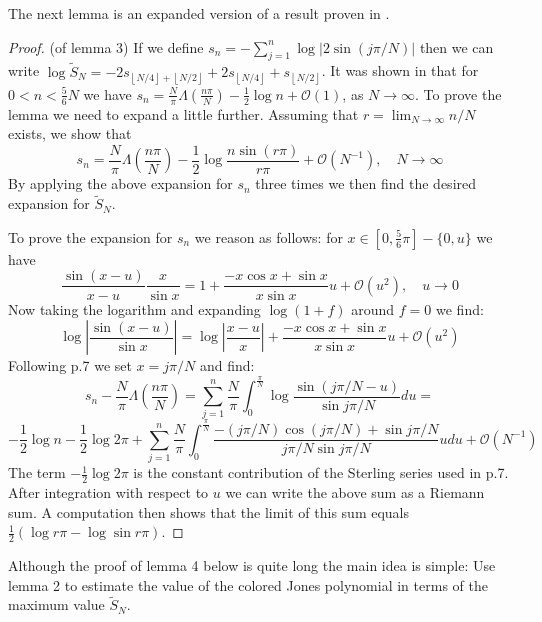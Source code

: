 \documentclass[letterpaper]{article}
\begin{document}
\noindent The next lemma is an expanded version of a result proven in \cite{HaoZheng}.

\begin{proof} (of lemma 3)
If we define $s_n = -\sum_{j=1}^n \log|2\sin(j\pi/N)|$ then we can write $\log \tilde{S}_N = -2s_{\left\lfloor N/4 \right\rfloor + \left\lfloor N/2 \right\rfloor}+2s_{\left\lfloor N/4 \right\rfloor}+s_{\left\lfloor N/2 \right\rfloor}$. It was shown in \cite{HaoZheng} that for $0<n<\frac{5}{6}N$ we have $s_n = \frac{N}{\pi}\Lambda(\frac{n\pi}{N})-\frac{1}{2}\log n + \mathcal{O}(1)$, as $N\to \infty$. To prove the lemma we need to expand a little further. Assuming that $r = \lim_{N\to\infty}n/N$ exists, we show that $$s_n = \frac{N}{\pi}\Lambda(\frac{n\pi}{N})-\frac{1}{2}\log \frac{n\sin(r\pi)}{r\pi} + \mathcal{O}(N^{-1}), \quad N\to \infty$$
By applying the above expansion for $s_n$ three times we then find the desired expansion for $\tilde{S}_N$.

To prove the expansion for $s_n$ we reason as follows: for $x\in [0,\frac{5}{6}\pi]-\{0,u\}$ we have $$\frac{\sin(x-u)}{x-u} \frac{x}{\sin x} = 1+\frac{-x\cos x +\sin x}{x\sin x}u + \mathcal{O}(u^2), \quad u \to 0$$ Now taking the logarithm and expanding $\log(1+f)$ around $f = 0$ we find: $$\log|\frac{\sin(x-u)}{\sin x}| = \log|\frac{x-u}{x}| +\frac{-x\cos x +\sin x}{x\sin x}u + \mathcal{O}(u^2)$$
Following \cite{HaoZheng} p.7 we set $x = j\pi/N$ and find:
$$s_n - \frac{N}{\pi}\Lambda(\frac{n\pi}{N})= \sum_{j=1}^n \frac{N}{\pi}\int_{0}^{\frac{\pi}{N}}\log\frac{\sin(j\pi/N-u)}{\sin j\pi/N}du = $$
$$-\frac{1}{2}\log n - \frac{1}{2}\log 2\pi + \sum_{j=1}^n \frac{N}{\pi}\int_{0}^{\frac{\pi}{N}}\frac{-(j\pi/N)\cos(j\pi/N) +\sin j\pi/N}{j\pi/N\sin j\pi/N}u du +\mathcal{O}(N^{-1})$$
The term $-\frac{1}{2}\log 2\pi$ is the constant contribution of the Sterling series used in \cite{HaoZheng} p.7. After integration with respect to $u$ we can write the above sum as a Riemann sum. A computation then shows that the limit of this sum equals $\frac{1}{2}(\log r\pi-\log\sin r\pi)$.
\end{proof}

\noindent Although the proof of lemma 4 below is quite long the
main idea is simple: Use lemma 2 to estimate the value of the
colored Jones polynomial in terms of the maximum value
$\tilde{S}_N$.
\end{document}
